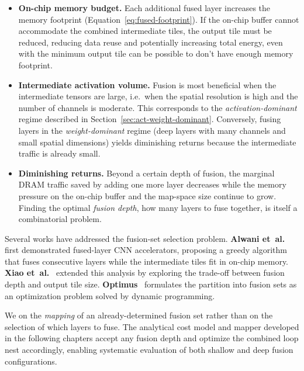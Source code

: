 \begin{itemize}
  \item \textbf{On-chip memory budget.}
        Each additional fused layer increases the memory footprint
        (Equation~\eqref{eq:fused-footprint}).  If the on-chip buffer
        cannot accommodate the combined intermediate tiles, the output
        tile must be reduced, reducing data reuse and potentially increasing
        total energy, even with the minimum output tile can be possible to don't have enough memory footprint.

  \item \textbf{Intermediate activation volume.}
        Fusion is most beneficial when the intermediate tensors are
        large, i.e.\ when the spatial resolution is high and the number
        of channels is moderate.  This corresponds to the
        \emph{activation-dominant} regime described in
        Section~\ref{sec:act-weight-dominant}.  Conversely, fusing
        layers in the \emph{weight-dominant} regime (deep layers with
        many channels and small spatial dimensions) yields diminishing
        returns because the intermediate traffic is already small.

  \item \textbf{Diminishing returns.}
        Beyond a certain depth of fusion, the marginal DRAM traffic saved
        by adding one more layer decreases while the memory pressure on
        the on-chip buffer and the map-space size continue to grow.
        Finding the optimal \emph{fusion depth},  how many
        layers to fuse together, is itself a combinatorial problem.
\end{itemize}

Several works have addressed the fusion-set selection problem.
\textbf{Alwani et~al.}~\cite{alwani2016fusedlayer} first demonstrated
fused-layer CNN accelerators, proposing a greedy algorithm that fuses
consecutive layers while the intermediate tiles fit in on-chip memory.
\textbf{Xiao et~al.}~\cite{xiao2017exploring} extended this analysis
by exploring the trade-off between fusion depth and output tile size.
\textbf{Optimus}~\cite{optimus} formulates the partition into fusion
sets as an optimization problem solved by dynamic programming.

We on the \emph{mapping} of an already-determined
fusion set rather than on the selection of which layers to fuse.
The analytical cost model and mapper developed in the following chapters
accept any fusion depth and optimize the combined loop nest accordingly,
enabling systematic evaluation of both shallow and deep fusion
configurations.
